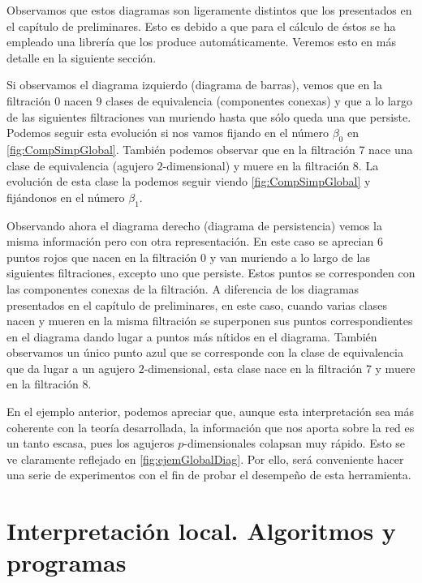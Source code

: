 \documentclass[12pt, a4paper, twoside]{book}
\numberwithin{equation}{section}
\theoremstyle{definition}
\newenvironment{ejem}
  {\pushQED{\qed}\renewcommand{\qedsymbol}{$\blacktriangleleft$}\ejemplo}
  {\popQED\endejemplo}
\theoremstyle{remark}
\theoremstyle{plain}
\begin{document}
\begin{ejem}
	Observamos que estos diagramas son ligeramente distintos que los 
	presentados en el capítulo de preliminares. Esto es debido a que para
	el cálculo de éstos se ha empleado una librería que los produce 
	automáticamente. Veremos esto en más detalle en la siguiente sección.

	Si observamos el diagrama izquierdo (diagrama de barras), vemos que en 
	la filtración 0 nacen 9 clases de equivalencia (componentes conexas) y
	que a lo largo de las siguientes filtraciones van muriendo hasta que 
	sólo queda una que persiste. Podemos seguir esta evolución si nos 
	vamos fijando en el número $\beta_{0}$ en  
	\autoref{fig:CompSimpGlobal}. También podemos observar que en la 
	filtración 7 nace una clase de equivalencia (agujero $2$-dimensional) 
	y muere en la filtración 8. La evolución de esta clase la podemos 
	seguir viendo \autoref{fig:CompSimpGlobal} y fijándonos en el 
	número $\beta_{1}$.

	Observando ahora el diagrama derecho (diagrama de persistencia) vemos 
	la misma información pero con otra representación. En este caso se 
	aprecian 6 puntos rojos que nacen en la filtración 0 y van muriendo a 
	lo largo de las siguientes filtraciones, excepto uno que persiste. 
	Estos puntos se corresponden 
	con las componentes conexas de la filtración. A diferencia de los 
	diagramas presentados en el capítulo de preliminares, en este caso, 
	cuando varias clases nacen y mueren en la misma filtración se 
	superponen sus puntos correspondientes en el diagrama dando lugar a 
	puntos más nítidos en el diagrama. También observamos un único punto 
	azul que se corresponde con la clase de equivalencia que da lugar a un
	agujero $2$-dimensional, esta clase nace en la filtración 7 y muere en
	la filtración 8.
	\end{ejem}

	En el ejemplo anterior, podemos apreciar que, aunque esta 
	interpretación sea más coherente con la teoría desarrollada, la 
	información que nos aporta sobre la red es un tanto escasa, pues los 
	agujeros $p$-dimensionales colapsan muy rápido. Esto se ve claramente 
	reflejado en \autoref{fig:ejemGlobalDiag}. Por ello, 
	será conveniente hacer una serie de experimentos con el fin de probar
	el desempeño de esta herramienta.

	\section{Interpretación local. Algoritmos y programas}
\end{document}
